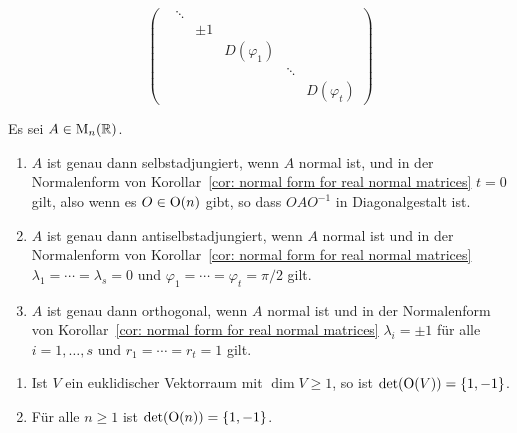 \begin{proposition}
\begin{enumerate}[leftmargin=*, label=\roman*)]
\[\begin{pmatrix}
                & \ddots  &       &               &         &               \\
                &         & \pm 1 &               &         &               \\
                &         &       & D(\varphi_1)  &         &               \\
                &         &       &               & \ddots  &               \\
                &         &       &               &         & D(\varphi_t)
        \end{pmatrix}
      \]
  \end{enumerate}
\end{proposition}


\begin{corollary}
  Es sei $A \in \mathrm{M}_n(\mathbb{R})$.
  \begin{enumerate}[leftmargin=*, label=\roman*)]
    \item
      $A$ ist genau dann selbstadjungiert, wenn $A$ normal ist, und in der Normalenform von Korollar~\ref{cor: normal form for real normal matrices} $t = 0$ gilt, also wenn es $O \in \mathrm{O}(n)$ gibt, so dass $O A O^{-1}$ in Diagonalgestalt ist.
    \item
      $A$ ist genau dann antiselbstadjungiert, wenn $A$ normal ist und in der Normalenform von Korollar~\ref{cor: normal form for real normal matrices} $\lambda_1 = \dotsb = \lambda_s = 0$ und $\varphi_1 = \dotsb = \varphi_t = \pi/2$ gilt.
    \item
      $A$ ist genau dann orthogonal, wenn $A$ normal ist und in der Normalenform von Korollar~\ref{cor: normal form for real normal matrices} $\lambda_i = \pm 1$ für alle $i = 1, \dotsc, s$ und $r_1 = \dotsb = r_t = 1$ gilt.
  \end{enumerate}
\end{corollary}


\begin{corollary}
  \begin{enumerate}[leftmargin=*, label=\roman*)]
    \item
      Ist $V$ ein euklidischer Vektorraum mit $\dim V \geq 1$, so ist $\det(\mathrm{O}(V)) = \{1,-1\}$.
    \item
      Für alle $n \geq 1$ ist $\det(\mathrm{O}(n)) = \{1,-1\}$.
  \end{enumerate}
\end{corollary}










